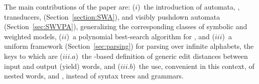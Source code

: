 
The main contributions of the paper are: 
($i$)~the introduction of automata, \SWA, transducers, \SWT (Section~\ref{section:SWA}),
and visibly pushdown automata \SWVPA (Section~\ref{sec:SWVPA}),
generalizing the corresponding classes of symbolic and weighted models, 
($ii$)~a polynomial best-search algorithm for \SWVPA, %
and ($iii$)~a uniform framework (Section~\ref{sec:parsing}) for parsing over infinite alphabets, 
the keys to which are 
($iii.a$)~the \SWT-based definition of generic edit distances between input and output (yield) words,
and ($iii.b$)~the use, convenient in this context, 
of nested words, and \SWVPA, 
instead of syntax trees and grammars. %
%



